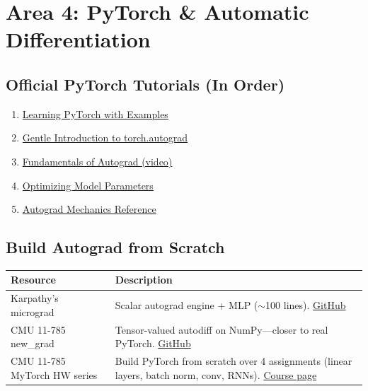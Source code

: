 \documentclass[11pt,letterpaper]{article}
\begin{document}
\newpage
\section{Area 4: PyTorch \& Automatic Differentiation}

\subsection{Official PyTorch Tutorials (In Order)}

\begin{enumerate}[nosep]
    \item \href{https://docs.pytorch.org/tutorials/beginner/pytorch_with_examples.html}{Learning PyTorch with Examples}
    \item \href{https://docs.pytorch.org/tutorials/beginner/blitz/autograd_tutorial.html}{Gentle Introduction to torch.autograd}
    \item \href{https://docs.pytorch.org/tutorials/beginner/introyt/autogradyt_tutorial.html}{Fundamentals of Autograd (video)}
    \item \href{https://docs.pytorch.org/tutorials/beginner/basics/optimization_tutorial.html}{Optimizing Model Parameters}
    \item \href{https://docs.pytorch.org/docs/stable/notes/autograd.html}{Autograd Mechanics Reference}
\end{enumerate}

\subsection{Build Autograd from Scratch}

\begin{longtable}{@{}p{2.2in}p{3.6in}@{}}
\toprule
\textbf{Resource} & \textbf{Description} \\
\midrule
\endhead
Karpathy's micrograd & Scalar autograd engine + MLP ($\sim$100 lines). \href{https://github.com/karpathy/micrograd}{GitHub} \\
\addlinespace
CMU 11-785 new\_grad & Tensor-valued autodiff on NumPy---closer to real PyTorch. \href{https://github.com/CMU-IDeeL/new_grad}{GitHub} \\
\addlinespace
CMU 11-785 MyTorch HW series & Build PyTorch from scratch over 4 assignments (linear layers, batch norm, conv, RNNs). \href{https://deeplearning.cs.cmu.edu/}{Course page} \\
\bottomrule
\end{longtable}
\end{document}
